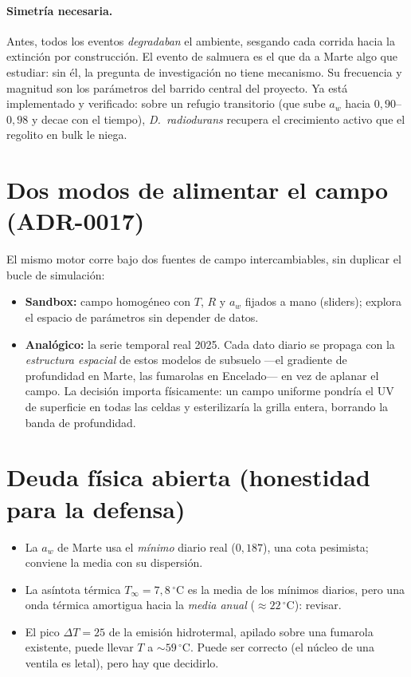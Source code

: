 \documentclass[11pt]{article}
\begin{document}
\paragraph{Simetría necesaria.} Antes, todos los eventos \emph{degradaban} el
ambiente, sesgando cada corrida hacia la extinción por construcción. El evento de
salmuera es el que da a Marte algo que estudiar: sin él, la pregunta de
investigación no tiene mecanismo. Su frecuencia y magnitud son los parámetros del
barrido central del proyecto. Ya está implementado y verificado: sobre un refugio
transitorio (que sube $a_w$ hacia $0{,}90$--$0{,}98$ y decae con el tiempo),
\emph{D.\ radiodurans} recupera el crecimiento activo que el regolito en bulk le
niega.

\section{Dos modos de alimentar el campo (ADR-0017)}

El mismo motor corre bajo dos fuentes de campo intercambiables, sin duplicar el
bucle de simulación:
\begin{itemize}[nosep]
  \item \textbf{Sandbox:} campo homogéneo con $T$, $R$ y $a_w$ fijados a mano
  (sliders); explora el espacio de parámetros sin depender de datos.
  \item \textbf{Analógico:} la serie temporal real 2025. Cada dato diario se
  propaga con la \emph{estructura espacial} de estos modelos de subsuelo —el
  gradiente de profundidad en Marte, las fumarolas en Encelado— en vez de aplanar
  el campo. La decisión importa físicamente: un campo uniforme pondría el UV de
  superficie en todas las celdas y esterilizaría la grilla entera, borrando la
  banda de profundidad.
\end{itemize}

\section*{Deuda física abierta (honestidad para la defensa)}
\begin{itemize}[nosep]
  \item La $a_w$ de Marte usa el \emph{mínimo} diario real ($0{,}187$), una cota
  pesimista; conviene la media con su dispersión.
  \item La asíntota térmica $T_{\infty}=7{,}8\,^\circ$C es la media de los mínimos
  diarios, pero una onda térmica amortigua hacia la \emph{media anual} ($\approx
  22\,^\circ$C): revisar.
  \item El pico $\Delta T=25$ de la emisión hidrotermal, apilado sobre una fumarola
  existente, puede llevar $T$ a $\sim\!59\,^\circ$C. Puede ser correcto (el núcleo
  de una ventila es letal), pero hay que decidirlo.
\end{itemize}
\end{document}
